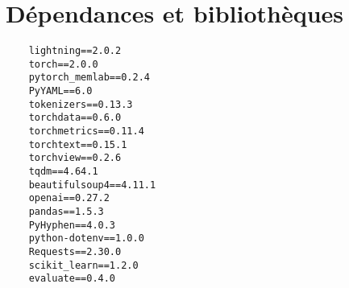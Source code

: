 \chapter{Dépendances et bibliothèques}%
\label{app.dependances}

\begin{center}
    \begin{verbatim}
    lightning==2.0.2
    torch==2.0.0
    pytorch_memlab==0.2.4
    PyYAML==6.0
    tokenizers==0.13.3
    torchdata==0.6.0
    torchmetrics==0.11.4
    torchtext==0.15.1
    torchview==0.2.6
    tqdm==4.64.1
    beautifulsoup4==4.11.1
    openai==0.27.2
    pandas==1.5.3
    PyHyphen==4.0.3
    python-dotenv==1.0.0
    Requests==2.30.0
    scikit_learn==1.2.0
    evaluate==0.4.0
    \end{verbatim}
\end{center}